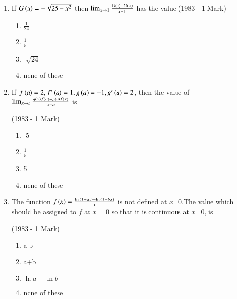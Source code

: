 \documentclass[journal,12pt,onecolumn]{IEEEtran}
\theoremstyle{remark}
\begin{document}
\begin{enumerate}
\begin{multicols}{2}
\begin{enumerate}
          
          
           
    \end{enumerate}
 \end{multicols}

\item If $G\left(x\right)=-\sqrt{25-x^2}$ then $\lim_{x \to 1}\frac{G\left(x\right)-G\left(x\right)}{x-1}$ has the value
	\hfill    {(1983 - 1 Mark)}
 \begin{multicols}{2}		
  \begin{enumerate}
    \item $\frac{1}{24}$
    \item $\frac{1}{5}$
    \item -$\sqrt{24}$
    \item none of these
    
  \end{enumerate}
 \end{multicols}

\item If $f\left(a\right)=2,f^{\prime}\left(a\right)=1,g\left(a\right)=-1,g^{\prime}\left(a\right)=2$, then the value of $\lim_{x\to a}\frac{g\left(x\right)f\left(a\right)-g\left(a\right)f\left(x\right)}{x-a}$ is

	\hfill {(1983 - 1 Mark)}
 \begin{multicols}{2}	
     \begin{enumerate}
         \item -5
         \item $\frac{1}{5}$
         \item 5
         \item none of these
     \end{enumerate}
 \end{multicols}	

\item The function $f\left(x\right)=\frac{\ln{\ensuremath{\left(1+ax\right)}}-\ln{\ensuremath{\left(1-bx\right)}}}{x}$ is not defined at $x$=0.The value which should be assigned to $f$ at $x=0$ so that it is continuous at $x$=0, is

	\hfill              {(1983 - 1 Mark)}
 \begin{multicols}{2}	
    \begin{enumerate}
        \item a-b
        \item a+b
        \item $\ln{a}-\ln{b}$
        \item none of these
        
    \end{enumerate}
 \end{multicols}	


\end{enumerate}
\end{document}
